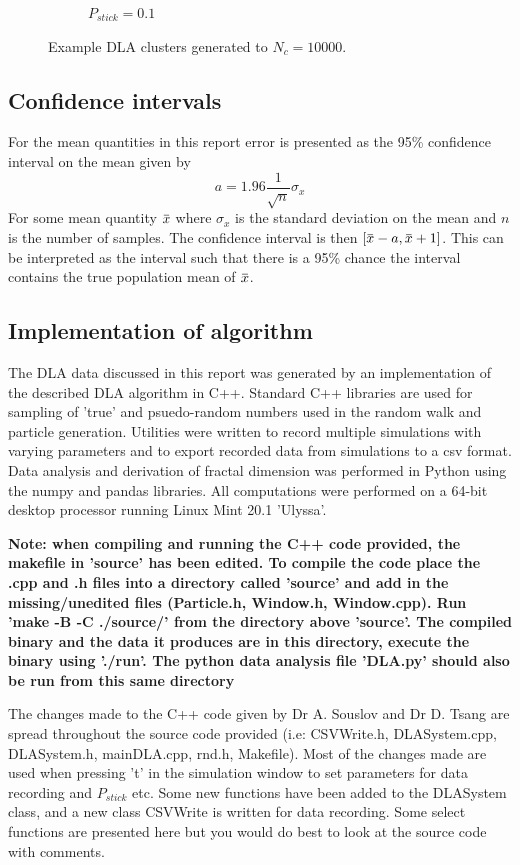 \documentclass[10pt, twocolumn]{article} %
\newcommand{\overbar}[1]{\mkern 1.5mu\overline{\mkern-1.5mu#1\mkern-1.5mu}\mkern 1.5mu}
\begin{document}
\begin{figure}[h!]
\begin{subfigure}[t]{0.45\textwidth}
    \caption{$P_{stick} = 0.1$}
  \end{subfigure}
  \caption{
    Example DLA clusters generated to $N_c = 10000$.
  }
\end{figure}

\subsection*{Confidence intervals}
  For the mean quantities in this report error is presented as the 95\% confidence interval on the mean given by
  \begin{equation}
    a = 1.96\frac{1}{\sqrt{n}}\sigma_x
  \end{equation}
  For some mean quantity $\overbar{x}$ where $\sigma_x$ is the standard deviation on the mean and $n$ is the number of samples. The confidence interval is then $[\overbar{x}-a, \overbar{x}+1]$. This can be interpreted as the interval such that there is a 95\% chance the interval contains the true population mean of $\overbar{x}$.

\subsection*{Implementation of algorithm}
  The DLA data discussed in this report was generated by an implementation of the described DLA algorithm in C++. Standard C++ libraries are used for sampling of 'true' and psuedo-random numbers used in the random walk and particle generation. Utilities were written to record multiple simulations with varying parameters and to export recorded data from simulations to a csv format. Data analysis and derivation of fractal dimension was performed in Python using the numpy and pandas libraries. All computations were performed on a 64-bit desktop processor running Linux Mint 20.1 'Ulyssa'.

  \textbf{Note: when compiling and running the C++ code provided, the makefile in 'source' has been edited. To compile the code place the .cpp and .h files into a directory called 'source' and add in the missing/unedited files (Particle.h, Window.h, Window.cpp). Run 'make -B -C ./source/' from the directory above 'source'. The compiled binary and the data it produces are in this directory, execute the binary using './run'. The python data analysis file 'DLA.py' should also be run from this same directory}

  The changes made to the C++ code given by Dr A. Souslov and Dr D. Tsang are spread throughout the source code provided (i.e: CSVWrite.h, DLASystem.cpp, DLASystem.h, mainDLA.cpp, rnd.h, Makefile). Most of the changes made are used when pressing 't' in the simulation window to set parameters for data recording and $P_{stick}$ etc. Some new functions have been added to the DLASystem class, and a new class CSVWrite is written for data recording. Some select functions are presented here but you would do best to look at the source code with comments.
\end{document}
